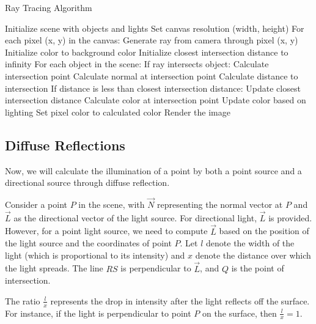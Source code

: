 \documentclass[conference]{IEEEtran}
\begin{document}
\begin{algorithm}
    \caption{Ray Tracing Algorithm}
    \begin{algorithmic}[1]
        \STATE Initialize scene with objects and lights
        \STATE Set canvas resolution (width, height)
        \STATE For each pixel (x, y) in the canvas:
            \STATE \quad Generate ray from camera through pixel (x, y)
            \STATE \quad Initialize color to background color
            \STATE \quad Initialize closest intersection distance to infinity
            \STATE \quad For each object in the scene:
                \STATE \quad \quad If ray intersects object:
                    \STATE \quad \quad \quad Calculate intersection point
                    \STATE \quad \quad \quad Calculate normal at intersection point
                    \STATE \quad \quad \quad Calculate distance to intersection
                    \STATE \quad \quad \quad If distance is less than closest intersection distance:
                        \STATE \quad \quad \quad \quad Update closest intersection distance
                        \STATE \quad \quad \quad \quad Calculate color at intersection point
                        \STATE \quad \quad \quad \quad Update color based on lighting
            \STATE \quad Set pixel color to calculated color
        \STATE Render the image
    \end{algorithmic}
\end{algorithm}
 
\subsection{Diffuse Reflections}

Now, we will calculate the illumination of a point by both a point source and a directional source through diffuse reflection.

Consider a point $ P $ in the scene, with $ \vec{N} $ representing the normal vector at $ P $ and $ \vec{L} $ as the directional vector of the light source. For directional light, $ \vec{L} $ is provided. However, for a point light source, we need to compute $ \vec{L} $ based on the position of the light source and the coordinates of point $ P $. Let $ l $ denote the width of the light (which is proportional to its intensity) and $ x $ denote the distance over which the light spreads. The line $ RS $ is perpendicular to $ \vec{L} $, and $ Q $ is the point of intersection.

The ratio $ \frac{l}{x} $ represents the drop in intensity after the light reflects off the surface. For instance, if the light is perpendicular to point $ P $ on the surface, then $ \frac{l}{x} = 1 $.
\end{document}
